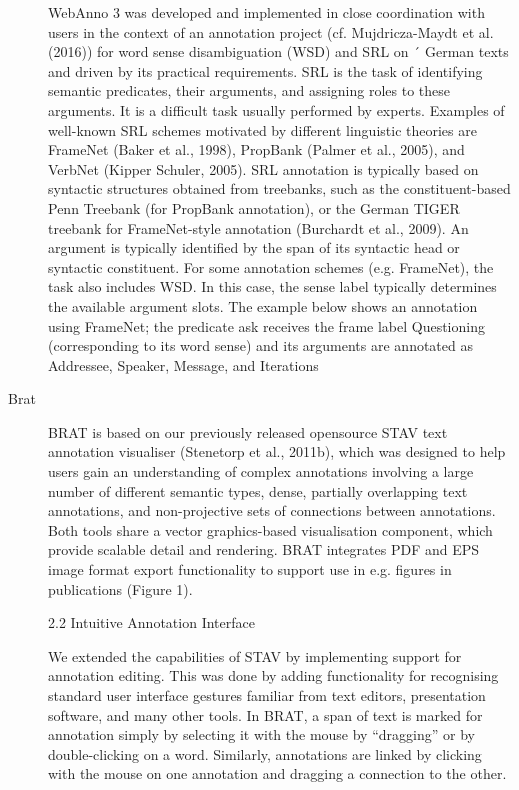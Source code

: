 \begin{description}
    WebAnno 3 was developed and implemented in close coordination with users in the context of an
    annotation project (cf. Mujdricza-Maydt et al. (2016)) for word sense disambiguation (WSD) and SRL on ´
    German texts and driven by its practical requirements. SRL is the task of identifying semantic predicates,
    their arguments, and assigning roles to these arguments. It is a difficult task usually performed by experts.
    Examples of well-known SRL schemes motivated by different linguistic theories are FrameNet (Baker
    et al., 1998), PropBank (Palmer et al., 2005), and VerbNet (Kipper Schuler, 2005). SRL annotation
    is typically based on syntactic structures obtained from treebanks, such as the constituent-based Penn
    Treebank (for PropBank annotation), or the German TIGER treebank for FrameNet-style annotation
    (Burchardt et al., 2009). An argument is typically identified by the span of its syntactic head or syntactic
    constituent. For some annotation schemes (e.g. FrameNet), the task also includes WSD. In this case, the
    sense label typically determines the available argument slots. The example below shows an annotation
    using FrameNet; the predicate ask receives the frame label Questioning (corresponding to its word sense)
    and its arguments are annotated as Addressee, Speaker, Message, and Iterations
        
    \item[Brat]
    BRAT is based on our previously released opensource STAV text annotation visualiser (Stenetorp et al., 2011b), which was designed to help
    users gain an understanding of complex annotations involving a large number of different semantic types, dense, partially overlapping text annotations, and non-projective sets of connections
    between annotations. Both tools share a vector
    graphics-based visualisation component, which
    provide scalable detail and rendering. BRAT integrates PDF and EPS image format export functionality to support use in e.g. figures in publications (Figure 1).

    2.2 Intuitive Annotation Interface

    We extended the capabilities of STAV by implementing support for annotation editing. This was
    done by adding functionality for recognising standard user interface gestures familiar from text editors, presentation software, and many other tools.
    In BRAT, a span of text is marked for annotation
    simply by selecting it with the mouse by “dragging” or by double-clicking on a word. Similarly,
    annotations are linked by clicking with the mouse
    on one annotation and dragging a connection to
    the other.


\end{description}
